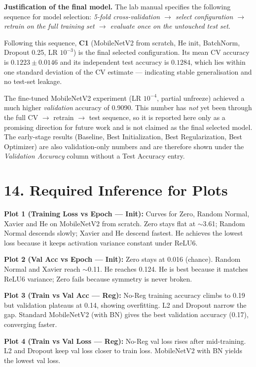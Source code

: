 \documentclass[10pt]{article}
\begin{document}
\textbf{Justification of the final model.} The lab manual specifies the
following sequence for model selection: \emph{5-fold cross-validation
$\rightarrow$ select configuration $\rightarrow$ retrain on the full
training set $\rightarrow$ evaluate once on the untouched test set}.

Following this sequence, \textbf{C1} (MobileNetV2 from scratch, He init,
BatchNorm, Dropout 0.25, LR $10^{-3}$) is the final selected
configuration. Its mean CV accuracy is $0.1223\pm0.0146$ and its
independent test accuracy is $0.1284$, which lies within one standard
deviation of the CV estimate --- indicating stable generalisation and
no test-set leakage.

The fine-tuned MobileNetV2 experiment (LR $10^{-4}$, partial unfreeze)
achieved a much higher \emph{validation} accuracy of 0.9090. This
number has \emph{not} yet been through the full CV $\rightarrow$ retrain
$\rightarrow$ test sequence, so it is reported here only as a promising
direction for future work and is not claimed as the final selected
model. The early-stage results (Baseline, Best Initialization, Best
Regularization, Best Optimizer) are also validation-only numbers and are
therefore shown under the \emph{Validation Accuracy} column without a
Test Accuracy entry.

\section*{14. Required Inference for Plots}

\textbf{Plot 1 (Training Loss vs Epoch --- Init):} Curves for Zero, Random Normal, Xavier and He on MobileNetV2 from scratch. Zero stays flat at $\sim$3.61; Random Normal descends slowly; Xavier and He descend fastest. He achieves the lowest loss because it keeps activation variance constant under ReLU6.

\textbf{Plot 2 (Val Acc vs Epoch --- Init):} Zero stays at 0.016 (chance). Random Normal and Xavier reach $\sim$0.11. He reaches 0.124. He is best because it matches ReLU6 variance; Zero fails because symmetry is never broken.

\textbf{Plot 3 (Train vs Val Acc --- Reg):} No-Reg training accuracy climbs to 0.19 but validation plateaus at 0.14, showing overfitting. L2 and Dropout narrow the gap. Standard MobileNetV2 (with BN) gives the best validation accuracy (0.17), converging faster.

\textbf{Plot 4 (Train vs Val Loss --- Reg):} No-Reg val loss rises after mid-training. L2 and Dropout keep val loss closer to train loss. MobileNetV2 with BN yields the lowest val loss.
\end{document}
